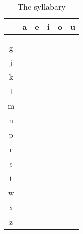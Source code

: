 \documentclass{article}
\newcommand*{\CP}[1]{\textcypr{#1}}
\begin{document}
\begin{table}
\centering
\caption{The syllabary}
\begin{tabular}{c|ccccc} \hline
  & a & e & i & o & u \\ \hline
\\
  & \CP{\Ca}  & \CP{\Ce}  & \CP{\Ci}  & \CP{\Co}  & \CP{\Cu} \\
g & \CP{\Cga} \\
j & \CP{\Cja} &           &           & \CP{\Cjo} \\
k & \CP{\Cka} & \CP{\Cke} & \CP{\Cki} & \CP{\Cko} & \CP{\Cku} \\
l & \CP{\Cla} & \CP{\Cle} & \CP{\Cli} & \CP{\Clo} & \CP{\Clu} \\
m & \CP{\Cma} & \CP{\Cme} & \CP{\Cmi} & \CP{\Cmo} & \CP{\Cmu} \\
n & \CP{\Cna} & \CP{\Cne} & \CP{\Cni} & \CP{\Cno} & \CP{\Cnu} \\
p & \CP{\Cpa} & \CP{\Cpe} & \CP{\Cpi} & \CP{\Cpo} & \CP{\Cpu} \\
r & \CP{\Cra} & \CP{\Cre} & \CP{\Cri} & \CP{\Cro} & \CP{\Cru} \\
s & \CP{\Csa} & \CP{\Cse} & \CP{\Csi} & \CP{\Cso} & \CP{\Csu} \\
t & \CP{\Cta} & \CP{\Cte} & \CP{\Cti} & \CP{\Cto} & \CP{\Ctu} \\
w & \CP{\Cwa} & \CP{\Cwe} & \CP{\Cwi} & \CP{\Cwo} \\
x & \CP{\Cxa} & \CP{\Cxe} &           &           \\ %
z &           &           &           & \CP{\Czo} 
\end{tabular}
\end{table}
\end{document}

